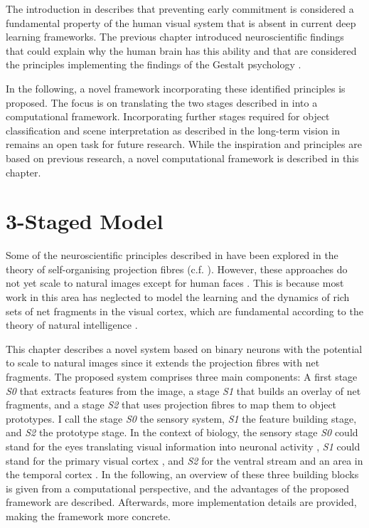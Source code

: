 The introduction in  describes that preventing early commitment \cite{marr_vision_2010} is considered a fundamental property of the human visual system that is absent in current deep learning frameworks.
The previous chapter introduced neuroscientific findings that could explain why the human brain has this ability and that are considered the principles implementing the findings of the Gestalt psychology \cite{ellis_source_1938, kohler_gestalt_1992, wagemans_century_2012, hamlyn_psychology_2017}.

In the following, a novel framework incorporating these identified principles is proposed.
The focus is on translating the two stages described in  into a computational framework.
Incorporating further stages required for object classification and scene interpretation as described in the long-term vision in  remains an open task for future research.
While the inspiration and principles are based on previous research, a novel computational framework is described in this chapter.

\section{3-Staged Model}
Some of the neuroscientific principles described in  have been explored in the theory of self-organising projection fibres  (c.f. ). However, these approaches do not yet scale to natural images except for human faces . This is because most work in this area has neglected to model the learning and the dynamics of rich sets of net fragments in the visual cortex, which are fundamental according to the theory of natural intelligence .

This chapter describes a novel system based on binary neurons with the potential to scale to natural images since it extends the projection fibres with net fragments.
The proposed system comprises three main components: A first stage \emph{S0} that extracts features from the image, a stage \emph{S1} that builds an overlay of net fragments, and a stage \emph{S2} that uses projection fibres to map them to object prototypes.
I call the stage \emph{S0} the sensory system, \emph{S1} the feature building stage, and \emph{S2} the prototype stage.
In the context of biology, the sensory stage \emph{S0} could stand for the eyes translating visual information into neuronal activity , \emph{S1} could stand for the primary visual cortex , and \emph{S2} for the ventral stream  and an area in the temporal cortex \cite{miyashita_inferior_1993}.
In the following, an overview of these three building blocks is given from a computational perspective, and the advantages of the proposed framework are described.
Afterwards, more implementation details are provided, making the framework more concrete.

